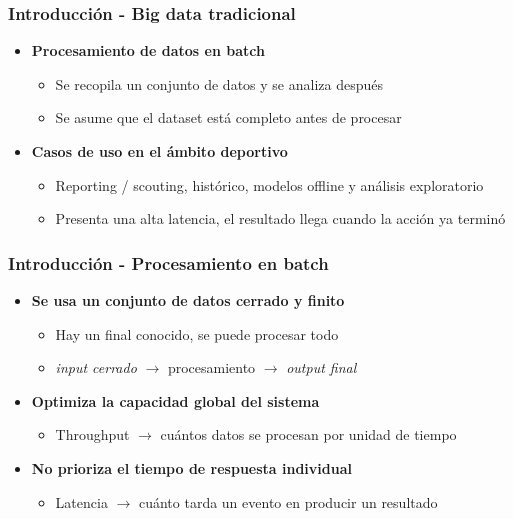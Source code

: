 \documentclass[aspectratio=169]{beamer}
\begin{document}
\begin{frame}
\frametitle{Introducción - Big data tradicional}
	\begin{itemize}
		\item \textbf{Procesamiento de datos en batch}
		\begin{itemize}
			\item Se recopila un conjunto de datos y se analiza después
			\item Se asume que el dataset está completo antes de procesar
		\end{itemize}

		\vspace{1em}

		\item \textbf{Casos de uso en el ámbito deportivo}
		\begin{itemize}
			\item Reporting / scouting, histórico, modelos offline y análisis exploratorio
			\item Presenta una alta latencia, el resultado llega cuando la acción ya terminó
		\end{itemize}
	\end{itemize}
\end{frame}

\begin{frame}
\frametitle{Introducción - Procesamiento en batch}
	\begin{itemize}
		\item \textbf{Se usa un conjunto de datos cerrado y finito}
		\begin{itemize}
			\item Hay un final conocido, se puede procesar todo
			\item \textit{input cerrado} $\rightarrow$ procesamiento $\rightarrow$ \textit{output final}
		\end{itemize}

		\vspace{1em}

    \item \textbf{Optimiza la capacidad global del sistema}
      \begin{itemize}
        \item Throughput $\rightarrow$ cuántos datos se procesan por unidad de tiempo
      \end{itemize}
    
    \vspace{1em}

    \item \textbf{No prioriza el tiempo de respuesta individual}
    \begin{itemize}
      \item Latencia $\rightarrow$ cuánto tarda un evento en producir un resultado
    \end{itemize}
  \end{itemize}
\end{frame}
\end{document}
